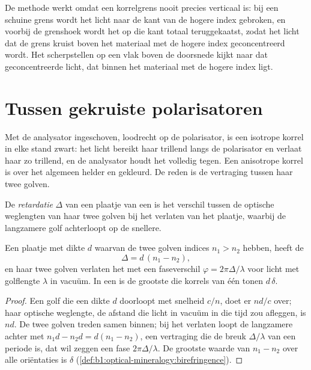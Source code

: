De methode werkt omdat een korrelgrens nooit precies verticaal is: bij een schuine grens wordt het licht naar de kant van de hogere index gebroken,
en voorbij de grenshoek wordt het op die kant totaal teruggekaatst, zodat het licht dat de grens kruist boven het materiaal met de hogere index
geconcentreerd wordt. Het scherpstellen op een vlak boven de doorsnede kijkt naar dat geconcentreerde licht, dat binnen het materiaal met de hogere index ligt.

\section{Tussen gekruiste polarisatoren}

Met de analysator ingeschoven, loodrecht op de polarisator, is een isotrope korrel in elke stand zwart: het licht bereikt haar trillend langs de polarisator
en verlaat haar zo trillend, en de analysator houdt het volledig tegen. Een anisotrope korrel is over het algemeen helder en gekleurd. De reden is de
vertraging tussen haar twee golven.

\begin{definition}\label{def:b1:optical-mineralogy:retardation}
De \emph{retardatie} $\Delta$ van een plaatje van een  is het verschil tussen de optische
weglengten van haar twee golven bij het verlaten van het plaatje, waarbij de langzamere golf achterloopt op de snellere.
\end{definition}

\begin{proposition}\label{prop:b1:optical-mineralogy:retardation}
Een plaatje met dikte $d$ waarvan de twee golven indices $n_1 > n_2$ hebben, heeft de 
\[
  \Delta = d\,(n_1 - n_2),
\]
en haar twee golven verlaten het met een faseverschil $\varphi = 2\pi\Delta/\lambda$ voor licht met golflengte $\lambda$ in vacuüm. In een 
is de grootste  die korrels van één  tonen $d\,\delta$.
\end{proposition}

\begin{proof}
Een golf die een dikte $d$ doorloopt met snelheid $c/n$, doet er $nd/c$ over; haar optische weglengte, de afstand die licht in vacuüm in die tijd zou afleggen,
is $nd$. De twee golven treden samen binnen; bij het verlaten loopt de langzamere achter met $n_1 d - n_2 d = d(n_1 - n_2)$, een vertraging die de
breuk $\Delta/\lambda$ van een periode is, dat wil zeggen een fase $2\pi\Delta/\lambda$. De grootste waarde van $n_1 - n_2$ over alle oriëntaties is $\delta$
(\cref{def:b1:optical-mineralogy:birefringence}).
\end{proof}

